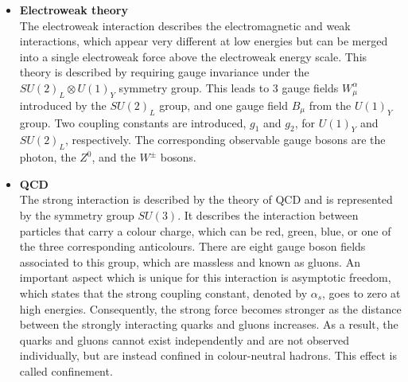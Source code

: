 \begin{itemize}
 \item[] \textbf{Electroweak theory}\\
 The electroweak interaction describes the electromagnetic and weak interactions, which appear very different at low energies but can be merged into a single electroweak force above the electroweak energy scale. This theory is described by requiring gauge invariance under the $SU(2)_L \otimes U(1)_Y$ symmetry group. This leads to 3 gauge fields $W_{\mu}^{\alpha}$ introduced by the $SU(2)_L$ group, and one gauge field $B_{\mu}$ from the $U(1)_Y$ group. Two coupling constants are introduced, $g_1$ and $g_2$, for $U(1)_Y$ and $SU(2)_L$, respectively. The corresponding observable gauge bosons are the photon, the $Z^0$, and the $W^{\pm}$ bosons.
 
 \item[] \textbf{\acf{QCD}}\\
 The strong interaction is described by the theory of \acl{QCD} and is represented by the symmetry group $SU(3)$. It describes the interaction between particles that carry a colour charge, which can be red, green, blue, or one of the three corresponding anticolours. There are eight gauge boson fields associated to this group, which are massless and known as gluons. An important aspect which is unique for this interaction is asymptotic freedom, which states that the strong coupling constant, denoted by $\alpha_s$, goes to zero at high energies. Consequently, the strong force becomes stronger as the distance between the strongly interacting quarks and gluons increases. As a result, the quarks and gluons cannot exist independently and are not observed individually, but are instead confined in colour-neutral hadrons. This effect is called confinement.
\end{itemize}
  

